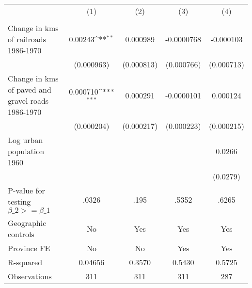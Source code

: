 {
\def\sym#1{\ifmmode^{#1}\else\(^{#1}\)\fi}
\begin{tabular}{l*{4}{c}}
\hline\hline
                &\multicolumn{1}{c}{(1)}&\multicolumn{1}{c}{(2)}&\multicolumn{1}{c}{(3)}&\multicolumn{1}{c}{(4)}\\
                &\multicolumn{1}{c}{}&\multicolumn{1}{c}{}&\multicolumn{1}{c}{}&\multicolumn{1}{c}{}\\
\hline
Change in kms of railroads 1986-1970&  0.00243\sym{**} & 0.000989         &-0.0000768         &-0.000103         \\
                &(0.000963)         &(0.000813)         &(0.000766)         &(0.000713)         \\
[1em]
Change in kms of paved and gravel roads 1986-1970& 0.000710\sym{***}& 0.000291         &-0.0000101         & 0.000124         \\
                &(0.000204)         &(0.000217)         &(0.000223)         &(0.000215)         \\
[1em]
Log urban population 1960&                  &                  &                  &   0.0266         \\
                &                  &                  &                  & (0.0279)         \\
\hline
P-value for testing $\beta\_{2} >= \beta\_{1}$&    .0326         &     .195         &    .5352         &.6265         \\
Geographic controls&       No         &      Yes         &      Yes         &      Yes         \\
Province FE     &       No         &       No         &      Yes         &      Yes         \\
R-squared       &  0.04656         &   0.3570         &   0.5430         &   0.5725         \\
Observations    &      311         &      311         &      311         &      287         \\
\hline\hline
\end{tabular}
}
